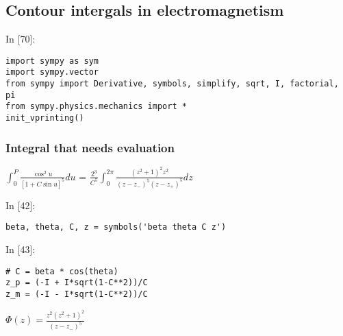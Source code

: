 \documentclass[11pt]{article}
\newif\ifcode
\newif\ifleftmargins
\newlength{\promptlength}
\newcommand{\prompt}[3]{
        \needspace{1.1cm}
        \settowidth{\promptlength}{ #1 [#3] }
        \ifleftmargins\hspace{-\promptlength}\hspace{-5pt}\fi
        {\color{#2}#1 [#3]:}
        \ifleftmargins\vspace{-2.7ex}\fi
    }
\renewcommand{\paragraph}{\textbf}
\begin{document}
    \hypertarget{contour-intergals-in-electromagnetism}{%
\subsection{Contour intergals in
electromagnetism}\label{contour-intergals-in-electromagnetism}}

    
\prompt{In}{incolor}{70}
\codetrue
\begin{tcolorbox}[breakable, size=fbox, boxrule=1pt, pad at break*=1mm, colback=cellbackground, colframe=cellborder]
\begin{verbatim}
import sympy as sym 
import sympy.vector
from sympy import Derivative, symbols, simplify, sqrt, I, factorial, pi
from sympy.physics.mechanics import *
init_vprinting()
\end{verbatim}
\end{tcolorbox}
\codefalse

    \hypertarget{integral-that-needs-evaluation}{%
\subsubsection{Integral that needs
evaluation}\label{integral-that-needs-evaluation}}

\(\int_0^P \frac{\cos^2u}{[1+C\sin u]^5} du\) =
\(\frac{2^3}{C^5} \int_0^{2\pi} \frac{(z^2+1)^2 z^2}{(z-z_-)^5(z-z_+)^5} dz\)

    
\prompt{In}{incolor}{42}
\codetrue
\begin{tcolorbox}[breakable, size=fbox, boxrule=1pt, pad at break*=1mm, colback=cellbackground, colframe=cellborder]
\begin{verbatim}
beta, theta, C, z = symbols('beta theta C z')
\end{verbatim}
\end{tcolorbox}
\codefalse

    
\prompt{In}{incolor}{43}
\codetrue
\begin{tcolorbox}[breakable, size=fbox, boxrule=1pt, pad at break*=1mm, colback=cellbackground, colframe=cellborder]
\begin{verbatim}
# C = beta * cos(theta)
z_p = (-I + I*sqrt(1-C**2))/C
z_m = (-I - I*sqrt(1-C**2))/C
\end{verbatim}
\end{tcolorbox}
\codefalse

    \hypertarget{phiz-fracz2z212z---z_-5}{%
\paragraph{\texorpdfstring{\(\Phi(z) = \frac{z^2(z^2+1)^2}{(z - z_-)^5}\)}{\textbackslash{}Phi(z) = \textbackslash{}frac\{z\^{}2(z\^{}2+1)\^{}2\}\{(z - z\_-)\^{}5\}}}\label{phiz-fracz2z212z---z_-5}}
\end{document}
